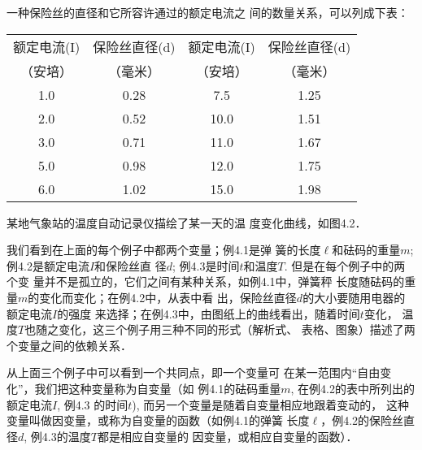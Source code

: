 \begin{example}
    一种保险丝的直径和它所容许通过的额定电流之
    间的数量关系，可以列成下表：
\begin{center}
\begin{tabular}{cccc}
    \hline
    额定电流(I)  &  保险丝直径(d)  &  额定电流(I) &  保险丝直径(d)\\
（安培）  &  （毫米）  &  （安培）  &  （毫米）  \\
\hline
1.0  &  0.28  &  7.5  &  1.25\\
2.0  &  0.52  &  10.0  &  1.51\\
3.0  &  0.71  &  11.0  &  1.67\\
5.0  &  0.98  &  12.0  &  1.75  \\
6.0  &  1.02  &  15.0  &  1.98\\
\hline
\end{tabular}
\end{center}


\end{example}

\begin{example}
    某地气象站的温度自动记录仪描绘了某一天的温
    度变化曲线，如图4.2．
\end{example}

\begin{figure}[htp]
    \centering
{}
    \caption{}
\end{figure}


我们看到在上面的每个例子中都两个变量；例4.1是弹
簧的长度$\ell$和砝码的重量$m$; 例4.2是额定电流$I$和保险丝直
径$d$; 例4.3是时间$t$和温度$T$. 但是在每个例子中的两个变
量并不是孤立的，它们之间有某种关系，如例4.1中，弹簧秤
长度随砝码的重量$m$的变化而变化；在例4.2中，从表中看
出，保险丝直径$d$的大小要随用电器的额定电流$I$的强度
来选择；在例4.3中，由图纸上的曲线看出，随着时间$t$变化，
温度$T$也随之变化，这三个例子用三种不同的形式（解析式、
表格、图象）描述了两个变量之间的依赖关系．

从上面三个例子中可以看到一个共同点，即一个变量可
在某一范围内“自由变化”，我们把这种变量称为自变量（如
例4.1的砝码重量$m$, 在例4.2的表中所列出的额定电流$I$, 例4.3
的时间$t$), 而另一个变量是随着自变量相应地跟着变动的，
这种变量叫做因变量，或称为自变量的函数（如例4.1的弹簧
长度$\ell$，例4.2的保险丝直径$d$, 例4.3的温度$T$都是相应自变量的
因变量，或相应自变量的函数）．

